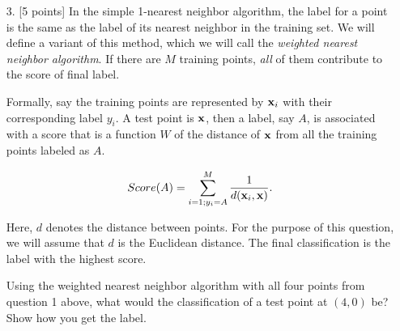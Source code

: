 \begin{enumerate}
\item[3.] [5 points] In the simple 1-nearest neighbor algorithm, the
  label for a point is the same as the label of its nearest neighbor
  in the training set. We will define a variant of this method, which
  we will call the {\em weighted nearest neighbor algorithm}. If there
  are $M$ training points, {\em all} of them contribute to the score
  of final label.

  Formally, say the training points are represented by ${\bf x}_i$
  with their corresponding label $y_i$. A test point is ${\bf x}$,
  then a label, say $A$, is associated with a score that is a function
  $W$ of the distance of ${\bf x}$ from all the training points
  labeled as $A$.

  $$Score(A) = \sum_{i=1; y_i = A}^M \frac{1}{d({\bf x}_i, {\bf x})}.$$

  Here, $d$ denotes the distance between points. For the purpose of
  this question, we will assume that $d$ is the Euclidean distance.
  The final classification is the label with the highest score.
  
  Using the weighted nearest neighbor algorithm with all four points
  from question 1 above, what would the classification of a test point
  at $(4, 0)$ be? Show how you get the label.
\end{enumerate}
